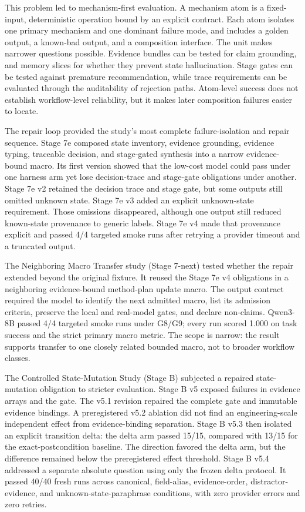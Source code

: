 \documentclass[11pt]{article}
\begin{document}
This problem led to mechanism-first evaluation. A mechanism atom is a fixed-input, deterministic operation bound by an explicit contract. Each atom isolates one primary mechanism and one dominant failure mode, and includes a golden output, a known-bad output, and a composition interface. The unit makes narrower questions possible. Evidence bundles can be tested for claim grounding, and memory slices for whether they prevent state hallucination. Stage gates can be tested against premature recommendation, while trace requirements can be evaluated through the auditability of rejection paths. Atom-level success does not establish workflow-level reliability, but it makes later composition failures easier to locate.

The repair loop provided the study's most complete failure-isolation and repair sequence. Stage 7e composed state inventory, evidence grounding, evidence typing, traceable decision, and stage-gated synthesis into a narrow evidence-bound macro. Its first version showed that the low-cost model could pass under one harness arm yet lose decision-trace and stage-gate obligations under another. Stage 7e v2 retained the decision trace and stage gate, but some outputs still omitted unknown state. Stage 7e v3 added an explicit unknown-state requirement. Those omissions disappeared, although one output still reduced known-state provenance to generic labels. Stage 7e v4 made that provenance explicit and passed 4/4 targeted smoke runs after retrying a provider timeout and a truncated output.

The Neighboring Macro Transfer study (Stage 7-next) tested whether the repair extended beyond the original fixture. It reused the Stage 7e v4 obligations in a neighboring evidence-bound method-plan update macro. The output contract required the model to identify the next admitted macro, list its admission criteria, preserve the local and real-model gates, and declare non-claims. Qwen3-8B passed 4/4 targeted smoke runs under G8/G9; every run scored 1.000 on task success and the strict primary macro metric. The scope is narrow: the result supports transfer to one closely related bounded macro, not to broader workflow classes.

The Controlled State-Mutation Study (Stage B) subjected a repaired state-mutation obligation to stricter evaluation. Stage B v5 exposed failures in evidence arrays and the gate. The v5.1 revision repaired the complete gate and immutable evidence bindings. A preregistered v5.2 ablation did not find an engineering-scale independent effect from evidence-binding separation. Stage B v5.3 then isolated an explicit transition delta: the delta arm passed 15/15, compared with 13/15 for the exact-postcondition baseline. The direction favored the delta arm, but the difference remained below the preregistered effect threshold. Stage B v5.4 addressed a separate absolute question using only the frozen delta protocol. It passed 40/40 fresh runs across canonical, field-alias, evidence-order, distractor-evidence, and unknown-state-paraphrase conditions, with zero provider errors and zero retries.
\end{document}
